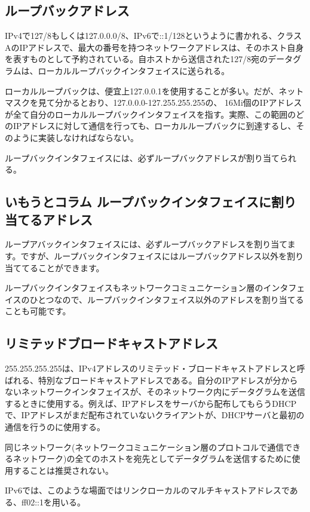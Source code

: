 \subsection{ループバックアドレス}

IPv4で127/8もしくは127.0.0.0/8、IPv6で::1/128というように書かれる、クラスAのIPアドレスで、最大の番号を持つネットワークアドレスは、そのホスト自身を表すものとして予約されている。自ホストから送信された127/8宛のデータグラムは、ローカルループバックインタフェイスに送られる。

ローカルループバックは、便宜上127.0.0.1を使用することが多い。だが、ネットマスクを見て分かるとおり、127.0.0.0-127.255.255.255の、 16Mi個のIPアドレスが全て自分のローカルループバックインタフェイスを指す。実際、この範囲のどのIPアドレスに対して通信を行っても、ローカルループバックに到達するし、そのように実装しなければならない。

ループバックインタフェイスには、必ずループバックアドレスが割り当てられる。

\subsection*{いもうとコラム ループバックインタフェイスに割り当てるアドレス}
ループアバックインタフェイスには、必ずループバックアドレスを割り当てます。ですが、ループバックインタフェイスにはループバックアドレス以外を割り当ててることができます。

ループバックインタフェイスもネットワークコミュニケーション層のインタフェイスのひとつなので、ループバックインタフェイス以外のアドレスを割り当てることも可能です。


\subsection{リミテッドブロードキャストアドレス}

255.255.255.255は、IPv4アドレスのリミテッド・ブロードキャストアドレスと呼ばれる、特別なブロードキャストアドレスである。自分のIPアドレスが分からないネットワークインタフェイスが、そのネットワーク内にデータグラムを送信するときに使用する。例えば、IPアドレスをサーバから配布してもらうDHCPで、IPアドレスがまだ配布されていないクライアントが、DHCPサーバと最初の通信を行うのに使用する。

同じネットワーク(ネットワークコミュニケーション層のプロトコルで通信できるネットワーク)の全てのホストを宛先としてデータグラムを送信するために使用することは推奨されない。

IPv6では、このような場面ではリンクローカルのマルチキャストアドレスである、ff02::1を用いる。


